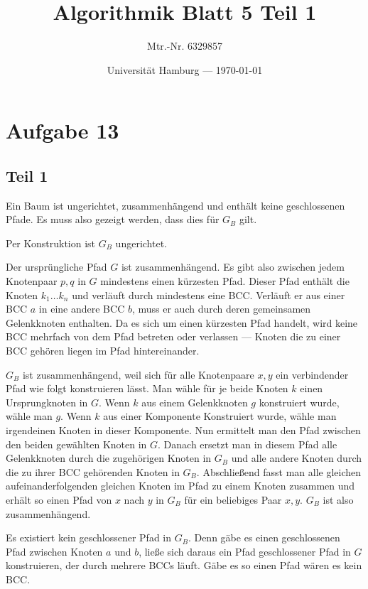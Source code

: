 \documentclass[parskip=half,a4paper]{scrartcl}
\title{Algorithmik Blatt 5 Teil 1}
\author{Mtr.-Nr. 6329857}
\date{Universität Hamburg --- \today}
\begin{document}
\maketitle %

\linenumbers

\section*{Aufgabe 13}

\subsection*{Teil 1}

Ein Baum ist ungerichtet, zusammenhängend und enthält keine geschlossenen Pfade. Es muss also gezeigt werden, dass dies für $G_B$ gilt.

Per Konstruktion ist $G_B$ ungerichtet.

Der ursprüngliche Pfad $G$ ist zusammenhängend. Es gibt also zwischen jedem Knotenpaar $p, q$ in $G$ mindestens einen kürzesten Pfad. Dieser Pfad enthält die Knoten $k_1\dots k_n$ und verläuft durch mindestens eine BCC. Verläuft er aus einer BCC $a$ in eine andere BCC $b$, muss er auch durch deren gemeinsamen Gelenkknoten enthalten. Da es sich um einen kürzesten Pfad handelt, wird keine BCC mehrfach von dem Pfad betreten oder verlassen --- Knoten die zu einer BCC gehören liegen im Pfad hintereinander.

$G_B$ ist zusammenhängend, weil sich für alle Knotenpaare $x,y$ ein verbindender Pfad wie folgt  konstruieren lässt. Man wähle für je beide Knoten $k$ einen Ursprungknoten in $G$. Wenn $k$ aus einem Gelenkknoten $g$ konstruiert wurde, wähle man $g$. Wenn $k$ aus einer Komponente Konstruiert wurde, wähle man irgendeinen Knoten in dieser Komponente. Nun ermittelt man den Pfad zwischen den beiden gewählten Knoten in $G$. Danach ersetzt man in diesem Pfad alle Gelenkknoten durch die zugehörigen Knoten in $G_B$ und alle andere Knoten durch die zu ihrer BCC gehörenden Knoten in $G_B$. Abschließend fasst man alle gleichen aufeinanderfolgenden gleichen Knoten im Pfad zu einem Knoten zusammen und erhält so einen Pfad von $x$ nach $y$ in $G_B$ für ein beliebiges Paar $x,y$. $G_B$ ist also zusammenhängend.

Es existiert kein geschlossener Pfad in $G_B$. Denn gäbe es einen geschlossenen Pfad zwischen Knoten $a$ und $b$, ließe sich daraus ein Pfad geschlossener Pfad in $G$ konstruieren, der durch mehrere BCCs läuft. Gäbe es so einen Pfad wären es kein BCC.
\end{document}
